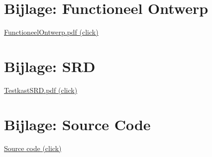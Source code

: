 \appendix

\section{Bijlage: Functioneel Ontwerp} \label{sec:FunctioneelOntwerp}

\href{run:FunctioneelOntwerp.pdf}{FunctioneelOntwerp.pdf (click)}

\section{Bijlage: \gls{SRD}} \label{sec:SRD}

\href{run:TestkastSRD.pdf}{TestkastSRD.pdf (click)}

\section{Bijlage: Source Code} \label{sec:SourceCode}

\href{https://github.com/voortman-steel-machinery/SpindelTestkast}{Source code (click)}